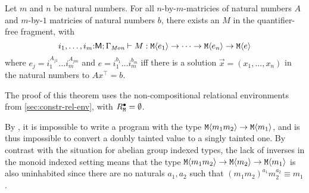 







\begin{theorem}
  \label{thm:monoid-indefinability}
  Let $m$ and $n$ be natural numbers. For all $n$-by-$m$-matricies of
  natural numbers $A$ and $m$-by-$1$ matricies of natural numbers $b$,
  there exists an $M$ in the quantifier-free fragment, with
  \begin{equation}
    i_1,\dots,i_m\mathord:\mathsf{M}; \Gamma_{\textit{Mon}} \vdash M : \textup{\texttt{M}}\langle e_1 \rangle \to \dots \to \textup{\texttt{M}}\langle e_n \rangle \to \textup{\texttt{M}}\langle e \rangle
  \end{equation}
  where $e_j = i_1^{A_{j1}}\dots i_m^{A_{jm}}$ and $e = i_1^{b_1}\dots
  i_m^{b_m}$ iff there is a solution $\vec{x} = (x_1,...,x_n)$ in the
  natural numbers to $A x^\top = b$.
\end{theorem}

The proof of this theorem uses the non-compositional relational
environments from \autoref{sec:constr-rel-env}, with
$R^\bullet_{\textup{\texttt{M}}} = \emptyset$.

\begin{example}
  By , it is impossible to write a
  program with the type $\textup{\texttt{M}}\langle m_1m_2 \rangle \to \textup{\texttt{M}}\langle m_1 \rangle$, and is thus %
  impossible to convert a doubly tainted value to a singly tainted
  one.
%
  By contrast with the situation for abelian group indexed types, the
  lack of inverses in the monoid indexed setting means that the type
  $\textup{\texttt{M}}\langle m_1m_2 \rangle \to \textup{\texttt{M}}\langle m_2 \rangle \to \textup{\texttt{M}}\langle m_1 \rangle$ is also
  uninhabited since there are no naturals $a_1,a_2$ such that
  $(m_1m_2)^{a_1}m_2^{a_2} \equiv m_1$.
\end{example}


